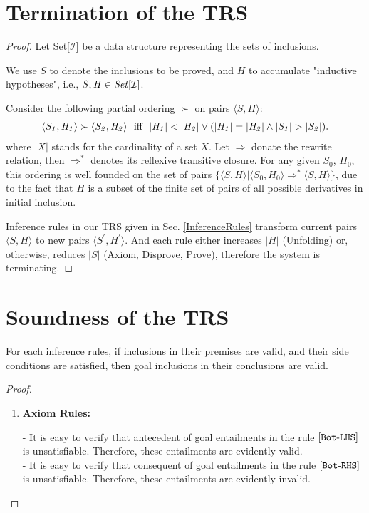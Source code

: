 \documentclass[acmsmall,10pt,review]{acmart}
\newcommand{\code}[1]{{\tt{\ensuremath{\m{#1}}}}}
\newcommand{\codeme}[1]{{\tt{\ensuremath{#1}}}}
\newcommand{\m}{\mathit}
\newcommand{\inclusion}{\code{\mathcal{I}}}
\newcommand\secref[1]{Sec. \textcolor{black}{\ref{#1}}}
\begin{document}
{{{\section{Termination  of the TRS}  \label{proof:TerminationProof}

\begin{proof}\label{proof:termination} 
Let Set[\inclusion] be a data structure representing the sets of inclusions. 

We use \code{S} to denote the inclusions to be proved, and \code{H} to accumulate  "inductive hypotheses", i.e., \code{S,  H \in Set[\inclusion]}.

Consider the following partial ordering \code{\succ} on pairs \code{\langle S, H \rangle}:
\begin{gather*}
\code{\langle S_1, H_1 \rangle \succ \langle S_2, H_2 \rangle}\ \ \text{iff}\ \ \code{|H_1| < |H_2| \vee 
(|H_1| = |H_2| \wedge |S_1| > |S_2|)}. 
\end{gather*}
where \code{|X|} stands for the cardinality of a set \code{X}.  Let \code{\Rightarrow} donate the rewrite relation, then \code{\Rightarrow^*} denotes its reflexive transitive closure. For any given \code{S_0}, \code{H_0}, this ordering is well founded on the set of pairs \code{\{\langle S, H \rangle | \langle S_0, H_0 \rangle \Rightarrow^* \langle S, H \rangle \}}, due to the fact that \code{H} is a subset of the finite set of pairs of all possible derivatives in initial inclusion.


Inference rules in our TRS given in \secref{InferenceRules} transform current pairs \code{\langle S, H \rangle} to new pairs \code{\langle S^\prime, H^\prime \rangle}. 
And each rule either increases \code{|H|} (Unfolding) or, otherwise, reduces \code{|S|} (Axiom, Disprove, Prove), therefore the system is terminating.




 \end{proof}


\section{Soundness  of the TRS} 
 \label{proof:SoundnessProof}
 

 


  For each inference rules, if inclusions in their premises are valid, and their side conditions are satisfied, then goal inclusions in their conclusions are valid.
  
  \begin{proof}
    ~\\
  \begin{enumerate}
  \item \textbf{Axiom Rules:} 
  
  - It is easy to verify that antecedent of goal entailments in the rule $\codeme{[Bot\text{-}LHS]}$ is unsatisfiable. Therefore, these entailments are evidently valid.\\
  - It is easy to verify that consequent of goal entailments in the rule $\codeme{[Bot\text{-}RHS]}$ is unsatisfiable. Therefore, these entailments are evidently invalid.\\
  

\end{enumerate}
\end{proof}}}}
\end{document}
